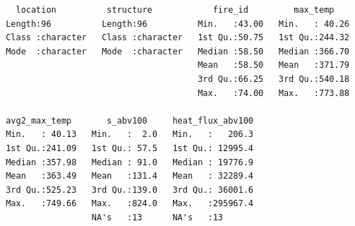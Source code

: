 \documentclass[11pt,a4paper]{article}
\begin{document}
\begin{verbatim}
   location          structure            fire_id         max_temp     
 Length:96          Length:96          Min.   :43.00   Min.   : 40.26  
 Class :character   Class :character   1st Qu.:50.75   1st Qu.:244.32  
 Mode  :character   Mode  :character   Median :58.50   Median :366.70  
                                       Mean   :58.50   Mean   :371.79  
                                       3rd Qu.:66.25   3rd Qu.:540.18  
                                       Max.   :74.00   Max.   :773.88  
                                                                       
 avg2_max_temp       s_abv100     heat_flux_abv100  
 Min.   : 40.13   Min.   :  2.0   Min.   :   206.3  
 1st Qu.:241.09   1st Qu.: 57.5   1st Qu.: 12995.4  
 Median :357.98   Median : 91.0   Median : 19776.9  
 Mean   :363.49   Mean   :131.4   Mean   : 32289.4  
 3rd Qu.:525.23   3rd Qu.:139.0   3rd Qu.: 36001.6  
 Max.   :749.66   Max.   :824.0   Max.   :295967.4  
                  NA's   :13      NA's   :13        
\end{verbatim}
\end{document}
